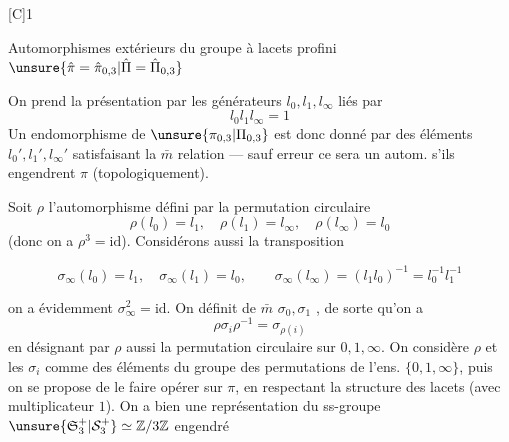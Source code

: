 [C]\qquad\textcircled{1}\qquad{}

Automorphismes extérieurs du groupe à lacets  profini $\unsure{\hat\pi=\hat\pi_{0,3}|\hat\Pi=\hat\Pi_{0,3}}$
\margin{$\unsure{\partial|\delta}$}

On prend la présentation par les générateurs $l_0,l_1,l_\infty$ liés par
\[
l_0l_1l_\infty=1
\]
Un endomorphisme de $\unsure{\pi_{0,3}|\Pi_{0,3}}$ est donc donné par des éléments $l_0',l_1',l_\infty'$ satisfaisant la $\bar m$ relation --- sauf erreur ce sera un autom. s'ils engendrent $\pi$ (topologiquement).

Soit $\rho$ l'automorphisme défini par la permutation circulaire
\[
\rho(l_0)=l_1,\quad\rho(l_1)=l_\infty,\quad\rho(l_\infty)=l_0
\]
(donc on a $\rho^3=\mathrm{id}$). Considérons aussi la transposition

\[
\sigma_\infty(l_0)=l_1,\quad\sigma_\infty(l_1)=l_0,\qquad
\sigma_\infty(l_\infty)=(l_1l_0)^{-1}=l_0^{-1}l_1^{-1}
\]

on a évidemment $\sigma_\infty^2=\mathrm{id}$. On définit de $\bar m$ $\sigma_0,\sigma_1$ , de sorte qu'on a
\[
\rho\sigma_i\rho^{-1}=\sigma_{\rho(i)}
\]
en désignant par $\rho$ aussi la permutation circulaire sur $0,1,\infty$. On considère $\rho$ et les $\sigma_i$ comme des éléments du groupe  des permutations de l'ens. $\{0,1,\infty\}$, puis on se propose de le faire opérer sur $\pi$, en respectant la structure des lacets (avec  multiplicateur $1$). On a bien une  représentation du ss-groupe $\unsure{\mathfrak S_3^+|\mathcal S_3^+}\simeq\mathbb Z/3\mathbb Z$ engendré
